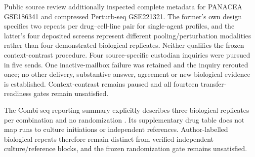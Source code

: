 Public source review additionally inspected complete metadata for PANACEA GSE186341 and compressed Perturb-seq GSE221321. The former's own design specifies two repeats per drug--cell-line pair for single-agent profiles, and the latter's four deposited screens represent different pooling/perturbation modalities rather than four demonstrated biological replicates. Neither qualifies the frozen context-contrast procedure. Four source-specific custodian inquiries were pursued in five sends. One inactive-mailbox failure was retained and the inquiry rerouted once; no other delivery, substantive answer, agreement or new biological evidence is established. Context-contrast remains paused and all fourteen transfer-readiness gates remain unsatisfied.

The Combi-seq reporting summary explicitly describes three biological replicates per combination and no randomization \citep{combiseq2022}. Its supplementary drug table does not map runs to culture initiations or independent references. Author-labelled biological repeats therefore remain distinct from verified independent culture/reference blocks, and the frozen randomization gate remains unsatisfied.
